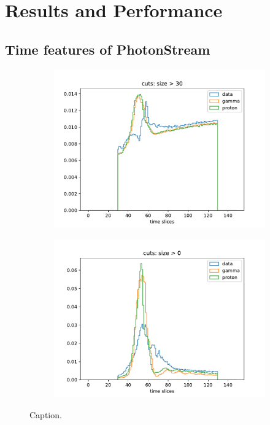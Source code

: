 \chapter{Results and Performance}
%
\section{Time features of PhotonStream}
%
\begin{figure}
  \begin{subfigure}{0.5\textwidth}
    \includegraphics[width=1.1\textwidth]{Plots/all_slices.pdf}
  \end{subfigure}
  \begin{subfigure}{0.5\textwidth}
    \includegraphics[width=1.1\textwidth]{Plots/all_slices_10_per_pixel.pdf}
  \end{subfigure}
  \caption{Caption.}
  \label{fig:slices}
\end{figure}

